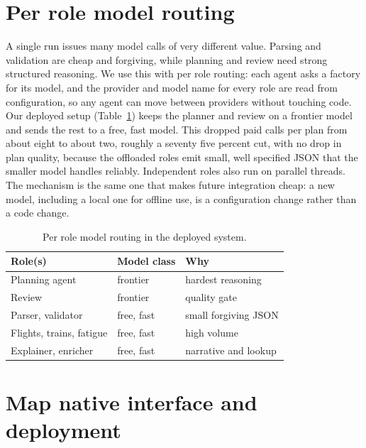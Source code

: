 \documentclass{ecai}
\begin{document}
\section{Per role model routing}
\label{sec:routing}

A single run issues many model calls of very different value. Parsing and
validation are cheap and forgiving, while planning and review need strong
structured reasoning. We use this with per role routing: each agent asks a
factory for its model, and the provider and model name for every role are read
from configuration, so any agent can move between providers without touching
code. Our deployed setup (Table~\ref{tab:routing}) keeps the planner and review
on a frontier model and sends the rest to a free, fast model. This dropped paid
calls per plan from about eight to about two, roughly a seventy five percent
cut, with no drop in plan quality, because the offloaded roles emit small,
well specified JSON that the smaller model handles reliably. Independent roles
also run on parallel threads. The mechanism is the same one that makes future
integration cheap: a new model, including a local one for offline use, is a
configuration change rather than a code change.

\begin{table}[h]
\caption{Per role model routing in the deployed system.}
\label{tab:routing}
\centering
\begin{tabular}{lll}
\toprule
Role(s) & Model class & Why \\
\midrule
Planning agent & frontier & hardest reasoning \\
Review & frontier & quality gate \\
Parser, validator & free, fast & small forgiving JSON \\
Flights, trains, fatigue & free, fast & high volume \\
Explainer, enricher & free, fast & narrative and lookup \\
\bottomrule
\end{tabular}
\end{table}

\section{Map native interface and deployment}
\label{sec:ui}
\end{document}
